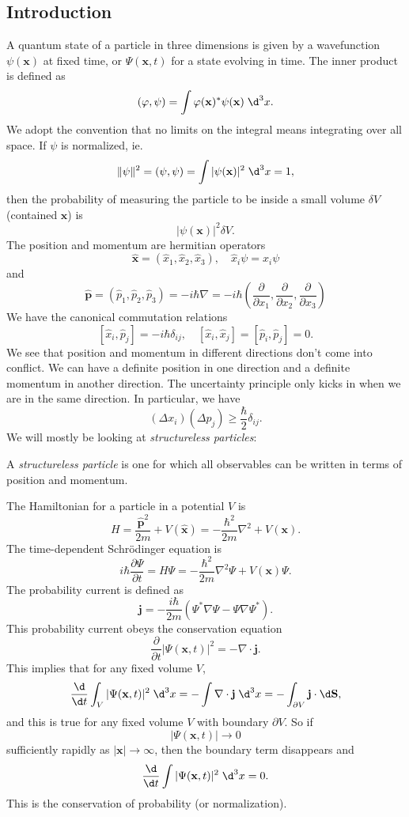 \documentclass[a4paper]{article}
\begin{document}
\subsection{Introduction}
A quantum state of a particle in three dimensions is given by a wavefunction $\psi(\mathbf{x})$ at fixed time, or $\Psi(\mathbf{x}, t)$ for a state evolving in time. The inner product is defined as
\[
  (\varphi, \psi) = \int \varphi(\mathbf{x})^* \psi(\mathbf{x})\;\d^3 x.
\]
We adopt the convention that no limits on the integral means integrating over all space. If $\psi$ is normalized, ie.
\[
  \|\psi\|^2 = (\psi, \psi) = \int |\psi(\mathbf{x})|^2 \;\d^3 x = 1,
\]
then the probability of measuring the particle to be inside a small volume $\delta V$ (contained $\mathbf{x}$) is
\[
  |\psi(\mathbf{x})|^2 \delta V.
\]
The position and momentum are hermitian operators
\[
  \hat{\mathbf{x}} = (\hat{x}_1, \hat{x}_2, \hat{x}_3),\quad \hat{x}_i \psi = x_i \psi
\]
and
\[
  \hat{\mathbf{p}} = (\hat{p}_1, \hat{p}_2, \hat{p}_3) = -i\hbar \nabla = -i\hbar \left(\frac{\partial}{\partial x_1}, \frac{\partial}{\partial x_2}, \frac{\partial}{\partial x_3}\right)
\]
We have the canonical commutation relations
\[
  [\hat{x}_i, \hat{p}_j] = -i\hbar \delta_{ij},\quad [\hat{x}_i, \hat{x}_j] = [\hat{p}_i, \hat{p}_j] = 0.
\]
We see that position and momentum in different directions don't come into conflict. We can have a definite position in one direction and a definite momentum in another direction. The uncertainty principle only kicks in when we are in the same direction. In particular, we have
\[
  (\Delta x_i)(\Delta p_j) \geq \frac{\hbar}{2} \delta_{ij}.
\]
We will mostly be looking at \emph{structureless particles}:
\begin{defi}
  A \emph{structureless particle} is one for which all observables can be written in terms of position and momentum.
\end{defi}
The Hamiltonian for a particle in a potential $V$ is
\[
  H = \frac{\hat{\mathbf{p}}^2}{2m} + V(\hat{\mathbf{x}}) = -\frac{\hbar^2}{2m} \nabla^2 + V(\mathbf{x}).
\]
The time-dependent Schr\"odinger equation is
\[
  i \hbar \frac{\partial \Psi}{\partial t} = H \Psi = -\frac{\hbar^2}{2m} \nabla^2\Psi + V(\mathbf{x})\Psi.
\]
The probability current is defined as
\[
  \mathbf{j} = -\frac{i\hbar}{2m} (\Psi^* \nabla \Psi - \Psi \nabla \Psi^*).
\]
This probability current obeys the conservation equation
\[
  \frac{\partial}{\partial t}|\Psi(\mathbf{x}, t)|^2 = -\nabla \cdot \mathbf{j}.
\]
This implies that for any fixed volume $V$,
\[
  \frac{\d}{\d t}\int_V |\Psi(\mathbf{x}, t)|^2 \;\d^3 x = -\int \nabla \cdot \mathbf{j}\;\d^3 x = -\int_{\partial V} \mathbf{j}\cdot \d \mathbf{S},
\]
and this is true for any fixed volume $V$ with boundary $\partial V$. So if
\[
  |\Psi(\mathbf{x}, t)| \to 0
\]
sufficiently rapidly as $|\mathbf{x}| \to \infty$, then the boundary term disappears and
\[
  \frac{\d}{\d t}\int |\Psi(\mathbf{x}, t)|^2 \;\d^3 x = 0.
\]
This is the conservation of probability (or normalization).
\end{document}

